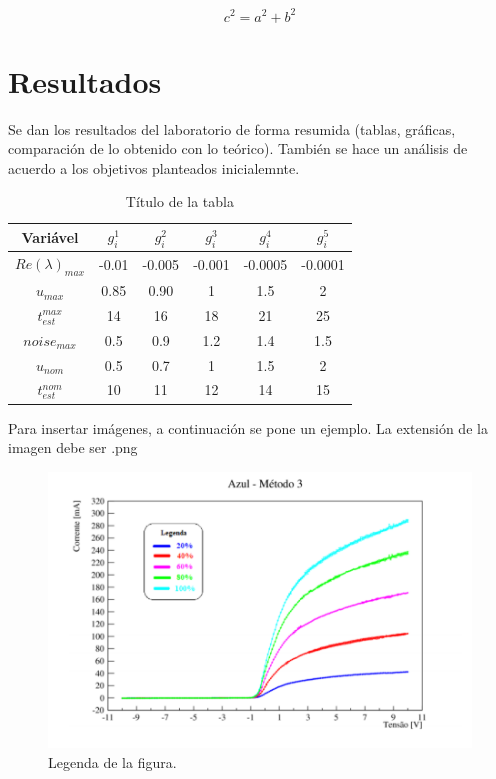 \documentclass[twoside]{article} %
\begin{document}
\begin{multicols}{2}
\begin{equation}
c^2=a^2+b^2
\label{eq:1}
\end{equation}

\section{Resultados}
Se dan los resultados del laboratorio de forma resumida (tablas, gráficas, comparación de lo obtenido con lo teórico). También se hace un análisis de acuerdo a los objetivos planteados inicialemnte. 

\begin{table}
\centering
\caption{Título de la tabla}
\begin{tabular}{cc c c c c}
\hline
 Variável & $g_i^1$ & $g_i^2$ & $g_i^3$ & $g_i^4$ & $g_i^5$ \\
    \hline
$Re(\lambda)_{max}$ & -0.01  & -0.005 & -0.001 & -0.0005 & -0.0001 \\
$u_{max}$& 0.85 & 0.90 & 1 & 1.5 & 2  \\
$t_{est}^{max}$& 14 & 16 & 18 & 21 & 25 \\
$noise_{max}$& 0.5 & 0.9 & 1.2 & 1.4 & 1.5  \\
$u_{nom}$& 0.5 & 0.7 & 1  & 1.5 & 2  \\
$t_{est}^{nom}$& 10 & 11 & 12 & 14 & 15 \\
\hline
  \end{tabular}
\label{table:1}
\end{table}

Para insertar imágenes, a continuación se pone un ejemplo. La extensión de la imagen debe ser .png



\begin{figure}[H] 
\centering
\includegraphics[scale=0.75]{figurateste.png} 
\caption{Legenda de la figura.} 
\label{fig:1} 
\end{figure}


\end{multicols}
\end{document}
